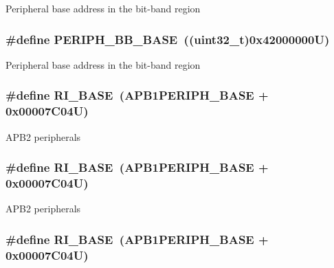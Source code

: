 Peripheral base address in the bit-\/band region \hypertarget{group___peripheral__memory__map_gaed7efc100877000845c236ccdc9e144a}{
\subsubsection[{P\-E\-R\-I\-P\-H\-\_\-\-B\-B\-\_\-\-B\-A\-S\-E}]{\setlength{\rightskip}{0pt plus 5cm}\#define P\-E\-R\-I\-P\-H\-\_\-\-B\-B\-\_\-\-B\-A\-S\-E~((uint32\-\_\-t)0x42000000\-U)}}\label{group___peripheral__memory__map_gaed7efc100877000845c236ccdc9e144a}
Peripheral base address in the bit-\/band region \hypertarget{group___peripheral__memory__map_ga8fdc749e6f184b3cd9b01f179af62e4c}{
\subsubsection[{R\-I\-\_\-\-B\-A\-S\-E}]{\setlength{\rightskip}{0pt plus 5cm}\#define R\-I\-\_\-\-B\-A\-S\-E~(A\-P\-B1\-P\-E\-R\-I\-P\-H\-\_\-\-B\-A\-S\-E + 0x00007\-C04\-U)}}\label{group___peripheral__memory__map_ga8fdc749e6f184b3cd9b01f179af62e4c}
A\-P\-B2 peripherals \hypertarget{group___peripheral__memory__map_ga8fdc749e6f184b3cd9b01f179af62e4c}{
\subsubsection[{R\-I\-\_\-\-B\-A\-S\-E}]{\setlength{\rightskip}{0pt plus 5cm}\#define R\-I\-\_\-\-B\-A\-S\-E~(A\-P\-B1\-P\-E\-R\-I\-P\-H\-\_\-\-B\-A\-S\-E + 0x00007\-C04\-U)}}\label{group___peripheral__memory__map_ga8fdc749e6f184b3cd9b01f179af62e4c}
A\-P\-B2 peripherals \hypertarget{group___peripheral__memory__map_ga8fdc749e6f184b3cd9b01f179af62e4c}{
\subsubsection[{R\-I\-\_\-\-B\-A\-S\-E}]{\setlength{\rightskip}{0pt plus 5cm}\#define R\-I\-\_\-\-B\-A\-S\-E~(A\-P\-B1\-P\-E\-R\-I\-P\-H\-\_\-\-B\-A\-S\-E + 0x00007\-C04\-U)}}\label{group___peripheral__memory__map_ga8fdc749e6f184b3cd9b01f179af62e4c}
